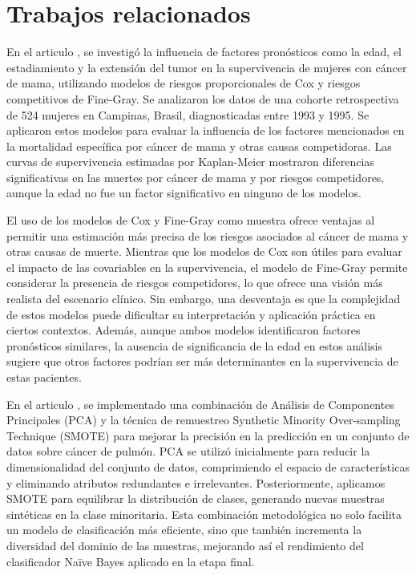 \documentclass[10pt,journal,compsoc]{IEEEtran}
\begin{document}
\section{Trabajos relacionados}

En el articulo \cite{ferraz2017}, se investigó la influencia de factores pronósticos como la edad, el estadiamiento y la extensión del tumor en la supervivencia de mujeres con cáncer de mama, utilizando modelos de riesgos proporcionales de Cox y riesgos competitivos de Fine-Gray. Se analizaron los datos de una cohorte retrospectiva de 524 mujeres en Campinas, Brasil, diagnosticadas entre 1993 y 1995. Se aplicaron estos modelos para evaluar la influencia de los factores mencionados en la mortalidad específica por cáncer de mama y otras causas competidoras. Las curvas de supervivencia estimadas por Kaplan-Meier mostraron diferencias significativas en las muertes por cáncer de mama y por riesgos competidores, aunque la edad no fue un factor significativo en ninguno de los modelos.

El uso de los modelos de Cox y Fine-Gray como muestra \cite{ferraz2017} ofrece ventajas al permitir una estimación más precisa de los riesgos asociados al cáncer de mama y otras causas de muerte. Mientras que los modelos de Cox son útiles para evaluar el impacto de las covariables en la supervivencia, el modelo de Fine-Gray permite considerar la presencia de riesgos competidores, lo que ofrece una visión más realista del escenario clínico. Sin embargo, una desventaja es que la complejidad de estos modelos puede dificultar su interpretación y aplicación práctica en ciertos contextos. Además, aunque ambos modelos identificaron factores pronósticos similares, la ausencia de significancia de la edad en estos análisis sugiere que otros factores podrían ser más determinantes en la supervivencia de estas pacientes.

En el articulo \cite{arxiv14031949}, se implementado una combinación de Análisis de Componentes Principales (PCA) y la técnica de remuestreo Synthetic Minority Over-sampling Technique (SMOTE) para mejorar la precisión en la predicción en un conjunto de datos sobre cáncer de pulmón. PCA se utilizó inicialmente para reducir la dimensionalidad del conjunto de datos, comprimiendo el espacio de características y eliminando atributos redundantes e irrelevantes. Posteriormente, aplicamos SMOTE para equilibrar la distribución de clases, generando nuevas muestras sintéticas en la clase minoritaria. Esta combinación metodológica no solo facilita un modelo de clasificación más eficiente, sino que también incrementa la diversidad del dominio de las muestras, mejorando así el rendimiento del clasificador Naïve Bayes aplicado en la etapa final.
\end{document}
